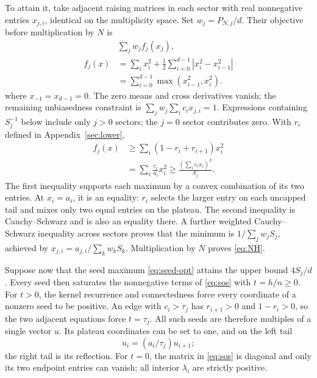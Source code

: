 \documentclass[aps,pra,reprint,superscriptaddress,longbibliography]{revtex4-2}
\theoremstyle{remark}
\begin{document}
To attain it, take adjacent raising matrices in each sector with
real nonnegative entries $x_{j,i}$, identical on the multiplicity
space. Set $w_j=P_{N,j}/d$. Their objective before multiplication
by $N$ is
\begin{equation}
\begin{aligned}
&\sum_jw_j f_j(x_j),\\
f_j(x)&=\sum_i x_i^2+\frac12\sum_{i=0}^{d-1}|x_i^2-x_{i-1}^2|\\
&=\sum_{i=0}^{d-1}\max(x_{i-1}^2,x_i^2).
\end{aligned}
\label{eq:NH-objective}
\end{equation}
where $x_{-1}=x_{d-1}=0$. The zero means and cross derivatives vanish;
the remaining unbiasedness constraint is
$\sum_jw_j\sum_i c_ix_{j,i}=1$.
Expressions containing $S_j^{-1}$ below include only $j>0$ sectors;
the $j=0$ sector contributes zero.
With $r_i$ defined in Appendix~\ref{sec:lower},
\begin{equation}
\begin{aligned}
f_j(x)&\geq\sum_i(1-r_i+r_{i+1})x_i^2\\
&=\sum_i\frac{c_i}{a_i}x_i^2
\geq\frac{(\sum_i c_ix_i)^2}{S_j}.
\end{aligned}
\label{eq:NH-CS}
\end{equation}
The first inequality supports each maximum by a convex combination
of its two entries. At $x_i=a_i$, it is an equality: $r_i$ selects
the larger entry on each uncapped tail and mixes only two equal
entries on the plateau. The second inequality is Cauchy--Schwarz
and is also an equality there. A further weighted
Cauchy--Schwarz inequality across sectors proves that the minimum
is $1/\sum_jw_jS_j$, achieved by
$x_{j,i}=a_{j,i}/\sum_kw_kS_k$. Multiplication by $N$ proves
\eqref{eq:NH}.

Suppose now that the seed maximum \eqref{eq:seed-opt} attains the
upper bound $4S_j/d$. Every seed then saturates the nonnegative
terms of \eqref{eq:sos} with $t=h/n\geq0$.
For $t>0$, the kernel recurrence and connectedness force every
coordinate of a nonzero seed to be positive. An edge with $c_i>
\tau_j$ has $r_{i+1}>0$ and $1-r_i>0$, so the two adjacent
equations force $t=\tau_j$. All such seeds are therefore multiples
of a single vector $u$. Its plateau coordinates can be set to one,
and on the left tail
\begin{equation}
 u_i=(a_i/\tau_j)u_{i+1};
 \label{eq:tail-recursion}
\end{equation}
the right tail is its reflection. For $t=0$, the matrix in
\eqref{eq:sos} is diagonal and only its two endpoint entries can
vanish; all interior $\lambda_i$ are strictly positive.
\end{document}
